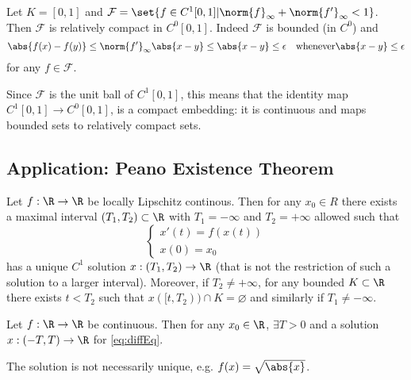 \documentclass{article}
\renewcommand{\emptyset}{\varnothing}
\begin{document}

\begin{eg}
    Let $K = [0, 1]$ and $\mathcal{F} = \set{f \in C^1[0, 1]|\norm{f}_\infty + \norm{f'}_\infty < 1}$.
    Then $\mathcal{F}$ is relatively compact in $C^0[0, 1]$.
    Indeed $\mathcal{F}$ is bounded (in $C^0$) and
    \begin{equation*}
        \abs{f(x) - f(y)} \leq \norm{f'}_\infty \abs{x - y} \leq \abs{x-y} \leq \epsilon \quad \text{whenever} \abs{x - y} \leq \epsilon
    \end{equation*}
    for any $f \in \mathcal{F}$.

    Since $\mathcal{F}$ is the unit ball of $C^1[0, 1]$, this means that the identity map $C^1[0, 1] \to C^0[0, 1]$, is a compact embedding: it is continuous and maps bounded sets to relatively compact sets.
\end{eg}

\subsection{Application: Peano Existence Theorem}
\begin{thm}
    Let $f: \R \to \R$ be locally Lipschitz continous. Then for any $x_0 \in R$ there exists a maximal interval $(T_1, T_2) \subset \R$ with $T_1 = -\infty$ and $T_2 = +\infty$ allowed such that
    \begin{equation*}
        \begin{cases}
            x'(t) = f(x(t)) \\
            x(0) = x_0
        \end{cases}
        \tag{$*$} \label{eq:diffEq}
    \end{equation*}
    has a unique $C^1$ solution $x:(T_1, T_2) \to \R$ (that is not the restriction of such a solution to a larger interval).
    Moreover, if $T_2 \neq +\infty$, for any bounded $K \subset \R$ there exists $t < T_2$ such that $x([t, T_2)) \cap K = \emptyset$ and similarly if $T_1 \neq -\infty$.
\end{thm}

\begin{thm}[Peano]
    Let $f: \R \to \R$ be continuous. Then for any $x_0 \in \R$, $\exists T > 0$ and a solution $x : (-T, T) \to \R$ for \eqref{eq:diffEq}.
\end{thm}

\begin{remark}
    The solution is not necessarily unique, e.g. $f(x) = \sqrt{\abs{x}}$.
\end{remark}
\end{document}
